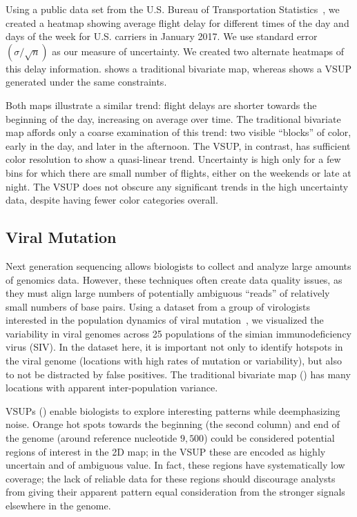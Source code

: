 \airlineFig

Using a public data set from the U.S. Bureau of Transportation Statistics~\cite{bts}, we created a heatmap showing average flight delay for different times of the day and days of the week for U.S. carriers in January 2017. We use standard error $\left(\sigma / \sqrt{n}\right)$ as our measure of uncertainty. We created two alternate heatmaps of this delay information.  shows a traditional bivariate map, whereas  shows a VSUP generated under the same constraints.

Both maps illustrate a similar trend: flight delays are shorter towards the beginning of the day, increasing on average over time. The traditional bivariate map affords only a coarse examination of this trend: two visible ``blocks'' of color, early in the day, and later in the afternoon. The VSUP, in contrast, has sufficient color resolution to show a quasi-linear trend. Uncertainty is high only for a few bins for which there are small number of flights, either on the weekends or late at night. The VSUP does not obscure any significant trends in the high uncertainty data, despite having fewer color categories overall.

\subsection{Viral Mutation}
\viralFig

Next generation sequencing allows biologists to collect and analyze large amounts of genomics data. However, these techniques often create data quality issues, as they must align large numbers of potentially ambiguous ``reads'' of relatively small numbers of base pairs. Using a dataset from a group of virologists interested in the population dynamics of viral mutation~\cite{o2012conditional}, we visualized the variability in viral genomes across 25 populations of the simian immunodeficiency virus (SIV). In the dataset here, it is important not only to identify hotspots in the viral genome (locations with high rates of mutation or variability), but also to not be distracted by false positives. The traditional bivariate map () has many locations with apparent inter-population variance.

VSUPs () enable biologists to explore interesting patterns while deemphasizing noise. Orange hot spots towards the beginning (the second column) and end of the genome (around reference nucleotide $9,500$) could be considered potential regions of interest in the 2D map; in the VSUP these are encoded as highly uncertain and of ambiguous value. In fact, these regions have systematically low coverage; the lack of reliable data for these regions should discourage analysts from giving their apparent pattern equal consideration from the stronger signals elsewhere in the genome.

